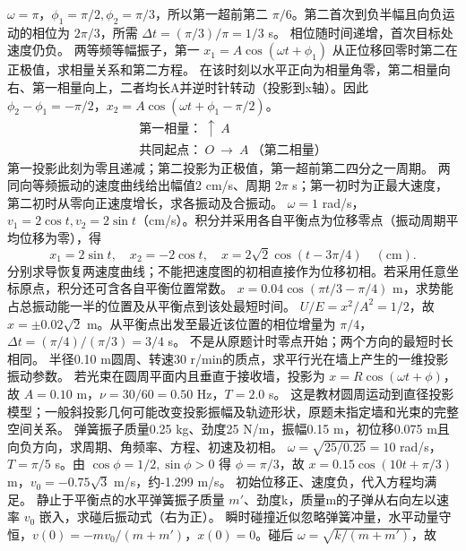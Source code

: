 \workings $\omega=\pi$，$\phi_1=\pi/2,\phi_2=\pi/3$，所以第一超前第二 $\pi/6$。第二首次到负半幅且向负运动的相位为 $2\pi/3$，所需 $\Delta t=(\pi/3)/\pi=1/3$ s。
\crosscheck 相位随时间递增，首次目标处速度仍负。
\problemtext 两等频等幅振子，第一 $x_1=A\cos(\omega t+\phi_1)$ 从正位移回零时第二在正极值，求相量关系和第二方程。
\workings 在该时刻以水平正向为相量角零，第二相量向右、第一相量向上，二者均长A并逆时针转动（投影到x轴）。因此 $\phi_2-\phi_1=-\pi/2$，$x_2=A\cos(\omega t+\phi_1-\pi/2)$。
\[
\begin{array}{c}
\text{第一相量：}\ \uparrow\ A\\
\text{共同起点：}\ O\ \longrightarrow\ A\ \text{（第二相量）}
\end{array}
\]
\crosscheck 第一投影此刻为零且递减；第二投影为正极值，第一超前第二四分之一周期。
\problemtext 两同向等频振动的速度曲线给出幅值2 cm/s、周期 $2\pi$ s；第一初时为正最大速度，第二初时从零向正速度增长，求各振动及合振动。
\workings $\omega=1$ rad/s，$v_1=2\cos t,v_2=2\sin t$（cm/s）。积分并采用各自平衡点为位移零点（振动周期平均位移为零），得
\[
x_1=2\sin t,\quad x_2=-2\cos t,\quad
x=2\sqrt2\cos(t-3\pi/4)\quad(\mathrm{cm}).
\]
\crosscheck 分别求导恢复两速度曲线；不能把速度图的初相直接作为位移初相。若采用任意坐标原点，积分还可含各自平衡位置常数。
\problemtext $x=0.04\cos(\pi t/3-\pi/4)$ m，求势能占总振动能一半的位置及从平衡点到该处最短时间。
\workings $U/E=x^2/A^2=1/2$，故 $x=\pm0.02\sqrt2$ m。从平衡点出发至最近该位置的相位增量为 $\pi/4$，$\Delta t=(\pi/4)/(\pi/3)=3/4$ s。
\crosscheck 不是从原题计时零点开始；两个方向的最短时长相同。
\problemtext 半径0.10 m圆周、转速30 r/min的质点，求平行光在墙上产生的一维投影振动参数。
\workings 若光束在圆周平面内且垂直于接收墙，投影为 $x=R\cos(\omega t+\phi)$，故 $A=0.10$ m，$\nu=30/60=0.50$ Hz，$T=2.0$ s。
\crosscheck 这是教材圆周运动到直径投影模型；一般斜投影几何可能改变投影振幅及轨迹形状，原题未指定墙和光束的完整空间关系。
\problemtext 弹簧振子质量0.25 kg、劲度25 N/m，振幅0.15 m，初位移0.075 m且向负方向，求周期、角频率、方程、初速及初相。
\workings $\omega=\sqrt{25/0.25}=10$ rad/s，$T=\pi/5$ s。由 $\cos\phi=1/2,\sin\phi>0$ 得 $\phi=\pi/3$，故 $x=0.15\cos(10t+\pi/3)$ m，$v_0=-0.75\sqrt3$ m/s，约-1.299 m/s。
\crosscheck 初始位移正、速度负，代入方程均满足。
\problemtext 静止于平衡点的水平弹簧振子质量 $m'$、劲度k，质量m的子弹从右向左以速率 $v_0$ 嵌入，求碰后振动式（右为正）。
\workings 瞬时碰撞近似忽略弹簧冲量，水平动量守恒，$v(0)=-mv_0/(m+m')$，$x(0)=0$。碰后 $\omega=\sqrt{k/(m+m')}$，故
